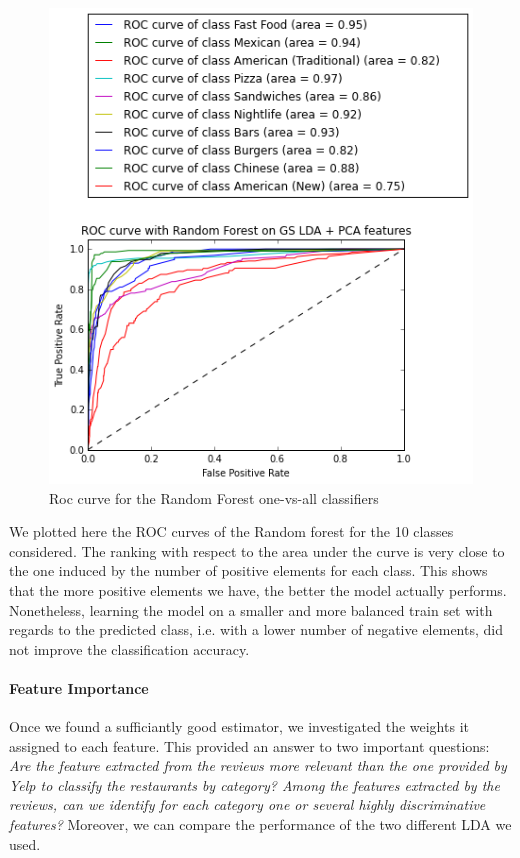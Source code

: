 \documentclass[twoside]{article}
\begin{document}
\begin{multicols}{2}
\begin{figure}[H]
	\includegraphics[scale=0.55]{img/roc_rf.png}
	\centering
	\caption{Roc curve for the Random Forest one-vs-all classifiers}
\end{figure}

\noindent We plotted here the ROC curves of the Random forest for the 10 classes considered. The ranking with respect to the area under the curve is very close to the one induced by the number of positive elements for each class. This shows that the more positive elements we have, the better the model actually performs. Nonetheless, learning the model on a smaller and more balanced train set with regards to the predicted class, i.e. with a lower number of negative elements, did not improve the classification accuracy.


\paragraph{Feature Importance}

\noindent Once we found a sufficiantly good estimator, we investigated the weights it assigned to each feature. This provided an answer to two important questions: \textit{Are the feature extracted from the reviews more relevant than the one provided by Yelp to classify the restaurants by category? Among the features extracted by the reviews, can we identify for each category one or several highly discriminative features?} Moreover, we can compare the performance of the two different LDA we used.\\


\end{multicols}
\end{document}
